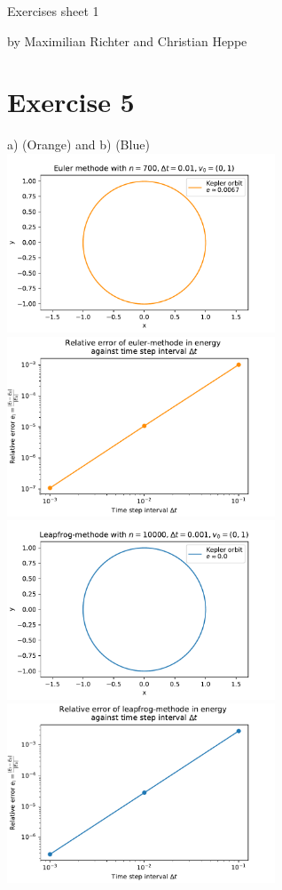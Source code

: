 \documentclass[12pt,a4paper,twoside]{article}
\begin{document}
\centerline{\large Exercises sheet 1}\vspace{0.5em}
\centerline{\large by Maximilian Richter and Christian Heppe}\vspace{2em}

\section*{Exercise 5}

a) (Orange) and b) (Blue)\\
\includegraphics[width=8cm]{euler.pdf}
\includegraphics[width=8cm]{error_euler.pdf}
\includegraphics[width=8cm]{leap.pdf}
\includegraphics[width=8cm]{error_leap.pdf}
\end{document}
